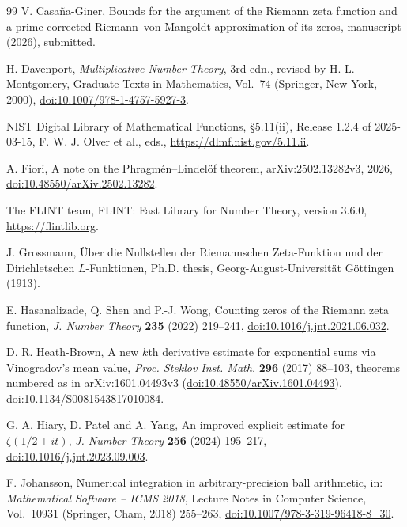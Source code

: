 \documentclass[11pt,reqno]{amsart}
\numberwithin{equation}{section}
\theoremstyle{definition}
\theoremstyle{remark}
\begin{document}
\begin{thebibliography}{99}
 V. Casa\~na-Giner, Bounds for the argument of the Riemann zeta function and a prime-corrected Riemann--von Mangoldt approximation of its zeros, manuscript (2026), submitted.

 H. Davenport, \textit{Multiplicative Number Theory}, 3rd edn., revised by H. L. Montgomery, Graduate Texts in Mathematics, Vol.~74 (Springer, New York, 2000), \href{https://doi.org/10.1007/978-1-4757-5927-3}{doi:10.1007/978-1-4757-5927-3}.

 NIST Digital Library of Mathematical Functions, \S5.11(ii), Release 1.2.4 of 2025-03-15, F. W. J. Olver et al., eds., \url{https://dlmf.nist.gov/5.11.ii}.

 A. Fiori, A note on the Phragm\'en--Lindel\"of theorem, arXiv:2502.13282v3, 2026, \href{https://doi.org/10.48550/arXiv.2502.13282}{doi:10.48550/arXiv.2502.13282}.

 The FLINT team, FLINT: Fast Library for Number Theory, version 3.6.0, \url{https://flintlib.org}.

 J. Grossmann, \"Uber die Nullstellen der Riemannschen Zeta-Funktion und der Dirichletschen $L$-Funktionen, Ph.D. thesis, Georg-August-Universit\"at G\"ottingen (1913).

 E. Hasanalizade, Q. Shen and P.-J. Wong, Counting zeros of the Riemann zeta function, \textit{J. Number Theory} \textbf{235} (2022) 219--241, \href{https://doi.org/10.1016/j.jnt.2021.06.032}{doi:10.1016/j.jnt.2021.06.032}.

 D. R. Heath-Brown, A new $k$th derivative estimate for exponential sums via Vinogradov's mean value, \textit{Proc. Steklov Inst. Math.} \textbf{296} (2017) 88--103, theorems numbered as in arXiv:1601.04493v3 (\href{https://doi.org/10.48550/arXiv.1601.04493}{doi:10.48550/arXiv.1601.04493}), \href{https://doi.org/10.1134/S0081543817010084}{doi:10.1134/S0081543817010084}.

 G. A. Hiary, D. Patel and A. Yang, An improved explicit estimate for $\zeta(1/2+it)$, \textit{J. Number Theory} \textbf{256} (2024) 195--217, \href{https://doi.org/10.1016/j.jnt.2023.09.003}{doi:10.1016/j.jnt.2023.09.003}.

 F. Johansson, Numerical integration in arbitrary-precision ball arithmetic, in: \textit{Mathematical Software -- ICMS 2018}, Lecture Notes in Computer Science, Vol.~10931 (Springer, Cham, 2018) 255--263, \href{https://doi.org/10.1007/978-3-319-96418-8_30}{doi:10.1007/978-3-319-96418-8\_30}.


\end{thebibliography}
\end{document}
